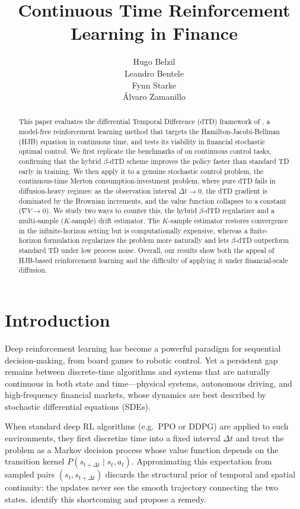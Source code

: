 \documentclass{article}
\title{Continuous Time Reinforcement Learning in Finance}
\author{%
  Hugo Belzil \\
  \And
  Leandro Bentele \\
  \And
  Fynn Starke \\
  \And
  Álvaro Zamanillo \\
}
\begin{document}
\maketitle


\begin{abstract}
This paper evaluates the differential Temporal Difference (dTD) framework of \citet{settai2025}, a model-free reinforcement learning method that targets the Hamilton-Jacobi-Bellman (HJB) equation in continuous time, and tests its viability in financial stochastic optimal control. We first replicate the benchmarks of \citet{settai2025} on continuous control tasks, confirming that the hybrid $\beta$-dTD scheme improves the policy faster than standard TD early in training. We then apply it to a genuine stochastic control problem, the continuous-time Merton consumption-investment problem, where pure dTD fails in diffusion-heavy regimes: as the observation interval $\Delta t \to 0$, the dTD gradient is dominated by the Brownian increments, and the value function collapses to a constant ($\nabla V \to 0$). We study two ways to counter this, the hybrid $\beta$-dTD regularizer and a multi-sample ($K$-sample) drift estimator. The $K$-sample estimator restores convergence in the infinite-horizon setting but is computationally expensive, whereas a finite-horizon formulation regularizes the problem more naturally and lets $\beta$-dTD outperform standard TD under low process noise. Overall, our results show both the appeal of HJB-based reinforcement learning and the difficulty of applying it under financial-scale diffusion.
\end{abstract}


\section{Introduction}
\label{sec:introduction}

Deep reinforcement learning has become a powerful paradigm for sequential decision-making, from board games to robotic control. Yet a persistent gap remains between discrete-time algorithms and systems that are naturally continuous in both state and time---physical systems, autonomous driving, and high-frequency financial markets, whose dynamics are best described by stochastic differential equations (SDEs).

When standard deep RL algorithms (e.g.\ PPO or DDPG) are applied to such environments, they first discretize time into a fixed interval $\Delta t$ and treat the problem as a Markov decision process whose value function depends on the transition kernel $P(s_{t+\Delta t} \mid s_t, a_t)$. Approximating this expectation from sampled pairs $(s_t, s_{t+\Delta t})$ discards the structural prior of temporal and spatial continuity: the updates never see the smooth trajectory connecting the two states. \citet{settai2025} identify this shortcoming and propose a remedy.
\end{document}
